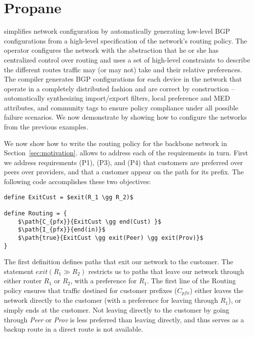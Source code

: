 \section{Propane}
\label{sec:propane}

\sysname simplifies network configuration by automatically generating low-level BGP configurations from a high-level specification of the network's routing policy. 
%
The operator configures the network with the abstraction that he or she has centralized control over routing and uses a set of high-level constraints to describe the different routes traffic may (or may not) take and their relative preferences. 
%
The \sysname compiler generates BGP configurations for each device in the network that operate in a completely distributed fashion and are correct by construction -- automatically synthesizing import/export filters, local preference and MED attributes, and community tags to ensure policy compliance under all possible failure scenarios.
%
We now demonstrate \sysname by showing how to configure the networks from the previous examples.


We now show how to write the routing policy for the backbone network in Section~\ref{sec:motivation}. \sysname allows to address each of the requirements in turn. First we address requirements (P1), (P3), and (P4) that customers are preferred over peers over providers, and that a customer appear on the path for its prefix. The following \sysname code accomplishes these two objectives:

\begin{lstlisting}[mathescape=true]
define ExitCust = $exit(R_1 \gg R_2)$

define Routing = {
    $\path{C_{pfx}}{ExitCust \gg end(Cust) }$
    $\path{I_{pfx}}{end(in)}$
    $\path{true}{ExitCust \gg exit(Peer) \gg exit(Prov)}$
}
\end{lstlisting}

The first definition defines paths that exit our network to the customer. The statement $exit(R_1 \gg R_2)$ restricts us to paths that leave our network through either router $R_1$ or $R_2$, with a preference for $R_1$. 
The first line of the \textsf{Routing} policy ensures that traffic destined for customer prefixes ($C_{pfx}$) either leaves the network directly to the customer (with a preference for leaving through $R_1$), or simply ends at the customer. Not leaving directly to the customer by going through \textit{Peer} or \textit{Prov} is less preferred than leaving directly, and thus serves as a backup route in a direct route is not available.

